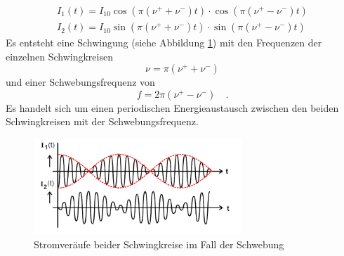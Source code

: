 \begin{align}\label{Schwebung}
	I_1(t) = I_{10}  \cos \left( \pi (\nu^+ + \nu^-) t \right) \cdot  \cos \left( \pi (\nu^+ - \nu^-) t \right) \\
	I_2 (t) = I_{10}  \sin \left( \pi (\nu^+ + \nu^-) t \right) \cdot  \sin \left( \pi (\nu^+ - \nu^-) t \right) 
\end{align}
Es entsteht eine Schwingung (siehe Abbildung \ref{fig:Abb3})  mit den Frequenzen der einzelnen Schwingkreisen 
\begin{equation}
	\nu = \pi (\nu^+ + \nu^-)
\end{equation}
und einer Schwebungsfrequenz von 
\begin{equation}
	f = 2 \pi (\nu^+ - \nu^-) \quad .
\end{equation}
Es handelt sich um einen periodischen Energieaustausch zwischen den beiden Schwingkreisen mit der Schwebungsfrequenz.
 \begin{figure}[h!]
 	\centering
 	\includegraphics[width=0.7\textwidth]{Abb3.png}
 	\caption{Stromveräufe beider Schwingkreise im Fall der Schwebung}
 	\label{fig:Abb3}
 \end{figure}